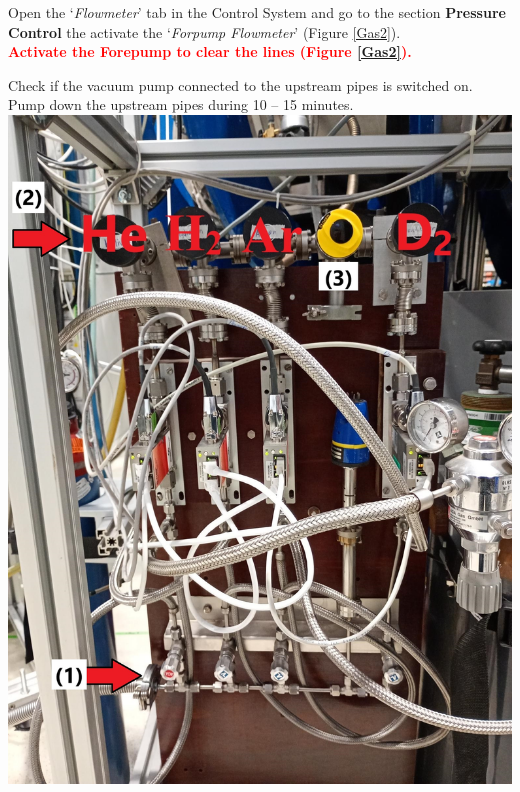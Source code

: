 \documentclass[fleqn,a4paper,20pt]{article}
\begin{document}
Open the `\textit{Flowmeter}' tab in the Control System and go to the section \textbf{Pressure Control} the activate the `\textit{Forpump Flowmeter}' (Figure \ref{Gas2}).\\


\textcolor{red}{\textbf{Activate the Forepump to clear the lines (Figure \ref{Gas2}).}}\\

\begin{minipage}{.3\textwidth}
	
{Check if the vacuum pump connected to the upstream pipes is switched on. Pump down the upstream pipes during 10 – 15 minutes. }\\

{
	\includegraphics[width=\linewidth]{Gas1}
	\label{Gas1}}
\end{minipage}
\begin{minipage}{.02\textwidth}
	$\ $\\
\end{minipage}
\end{document}
